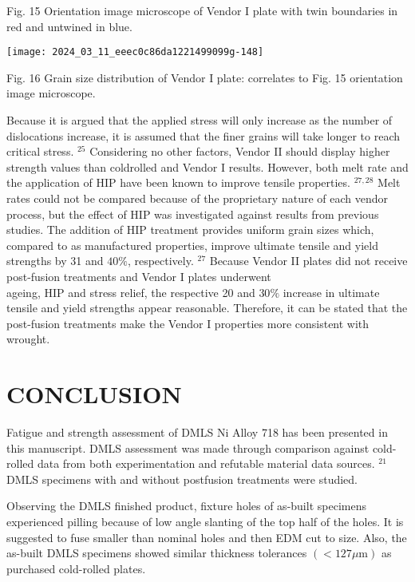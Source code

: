 \documentclass[10pt]{article}
\begin{document}
Fig. 15 Orientation image microscope of Vendor I plate with twin boundaries in red and untwined in blue.

\begin{center}
\texttt{[image: 2024\_03\_11\_eeec0c86da1221499099g-148]}
\end{center}

Fig. 16 Grain size distribution of Vendor I plate: correlates to Fig. 15 orientation image microscope.

Because it is argued that the applied stress will only increase as the number of dislocations increase, it is assumed that the finer grains will take longer to reach critical stress. ${ }^{25}$ Considering no other factors, Vendor II should display higher strength values than coldrolled and Vendor I results. However, both melt rate and the application of HIP have been known to improve tensile properties. ${ }^{27,28}$ Melt rates could not be compared because of the proprietary nature of each vendor process, but the effect of HIP was investigated against results from previous studies. The addition of HIP treatment provides uniform grain sizes which, compared to as manufactured properties, improve ultimate tensile and yield strengths by 31 and $40 \%$, respectively. ${ }^{27}$ Because Vendor II plates did not receive post-fusion treatments and Vendor I plates underwent\\
ageing, HIP and stress relief, the respective 20 and $30 \%$ increase in ultimate tensile and yield strengths appear reasonable. Therefore, it can be stated that the post-fusion treatments make the Vendor I properties more consistent with wrought.

\section*{CONCLUSION}
Fatigue and strength assessment of DMLS Ni Alloy 718 has been presented in this manuscript. DMLS assessment was made through comparison against cold-rolled data from both experimentation and refutable material data sources. ${ }^{21}$ DMLS specimens with and without postfusion treatments were studied.

Observing the DMLS finished product, fixture holes of as-built specimens experienced pilling because of low angle slanting of the top half of the holes. It is suggested to fuse smaller than nominal holes and then EDM cut to size. Also, the as-built DMLS specimens showed similar thickness tolerances $(<127 \mu \mathrm{m})$ as purchased cold-rolled plates.
\end{document}
